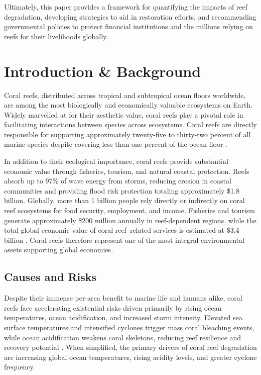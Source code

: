\documentclass[10pt,letterpaper]{article}
\begin{document}
Ultimately, this paper provides a framework for quantifying the impacts of reef degradation, developing strategies to aid in restoration efforts, and recommending governmental policies to protect financial institutions and the millions relying on reefs for their livelihoods globally.

\clearpage

\begingroup
{}
\setlength{\columnseprule}{0.4pt}
\tableofcontents
\endgroup
\clearpage

\section{Introduction \& Background}

Coral reefs, distributed across tropical and subtropical ocean floors worldwide, are among the most biologically and economically valuable ecosystems on Earth. Widely marvelled at for their aesthetic value, coral reefs play a pivotal role in facilitating interactions between species across ecosystems. Coral reefs are directly responsible for supporting approximately twenty-five to thirty-two percent of all marine species despite covering less than one percent of the ocean floor \cite{epa_2025, unep_2025}. 

In addition to their ecological importance, coral reefs provide substantial economic value through fisheries, tourism, and natural coastal protection. Reefs absorb up to 97\% of wave energy from storms, reducing erosion in coastal communities and providing flood risk protection totaling approximately \$1.8 billion. Globally, more than 1 billion people rely directly or indirectly on coral reef ecosystems for food security, employment, and income. Fisheries and tourism generate approximately \$200 million annually in reef-dependent regions, while the total global economic value of coral reef–related services is estimated at \$3.4 billion \cite{noaa_2026_econ}. Coral reefs therefore represent one of the most integral environmental assets supporting global economies.

\subsection{Causes and Risks}

Despite their immense per-area benefit to marine life and humans alike, coral reefs face accelerating existential risks driven primarily by rising ocean temperatures, ocean acidification, and increased storm intensity. Elevated sea surface temperatures and intensified cyclones trigger mass coral bleaching events, while ocean acidification weakens coral skeletons, reducing reef resilience and recovery potential \cite{unep_nd, hughes2017, hughes2018}. When simplified, the primary drivers of coral reef degradation are increasing global ocean temperatures, rising acidity levels, and greater cyclone frequency.
\end{document}
